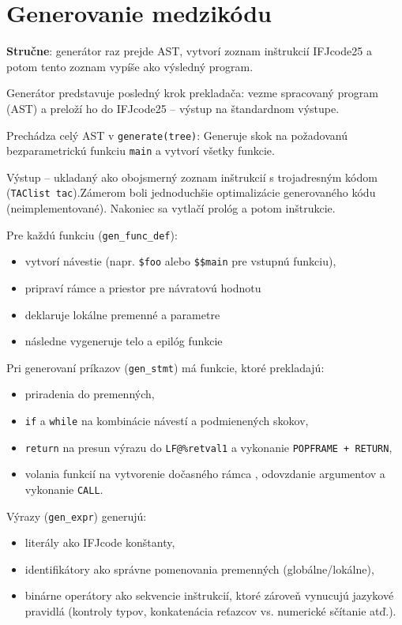 \documentclass{article}
\begin{document}
\section{Generovanie medzikódu}

\textbf{Stručne}: generátor raz prejde AST, vytvorí zoznam inštrukcií IFJcode25 a potom tento
zoznam vypíše ako výsledný program.\bigskip

Generátor predstavuje posledný krok prekladača: vezme spracovaný program (AST) a
preloží ho do IFJcode25 -- výstup na štandardnom výstupe.

Prechádza celý AST v \texttt{generate(tree)}:
Generuje skok na požadovanú bezparametrickú funkciu \texttt{main} a vytvorí všetky funkcie.

Výstup -- ukladaný ako obojsmerný zoznam inštrukcií s trojadresným kódom (\texttt{TAClist tac}).Zámerom boli jednoduchšie optimalizácie generovaného kódu (neimplementované). Nakoniec sa vytlačí prológ a potom inštrukcie.\bigskip

\noindent Pre každú funkciu (\texttt{gen\_func\_def}):

\begin{itemize}
    \item vytvorí návestie (napr. \texttt{\$foo} alebo \texttt{\$\$main} pre vstupnú funkciu),
    \item pripraví rámce a priestor pre návratovú hodnotu
    \item deklaruje lokálne premenné a parametre
    \item následne vygeneruje telo a epilóg funkcie
\end{itemize}

Pri generovaní príkazov (\texttt{gen\_stmt}) má funkcie, ktoré prekladajú:

\begin{itemize}
    \item priradenia do premenných,
    \item \texttt{if} a \texttt{while} na kombinácie návestí a podmienených skokov,
    \item \texttt{return} na presun výrazu do \texttt{LF@\%retval1} a vykonanie \texttt{POPFRAME + RETURN},
    \item volania funkcií na vytvorenie dočasného rámca , odovzdanie argumentov a vykonanie \texttt{CALL}.
\end{itemize}

Výrazy (\texttt{gen\_expr}) generujú:

\begin{itemize}
    \item literály ako IFJcode konštanty,
    \item identifikátory ako správne pomenovania premenných (globálne/lokálne),
    \item binárne operátory ako sekvencie inštrukcií, ktoré zároveň vynucujú jazykové pravidlá (kontroly typov, konkatenácia reťazcov vs. numerické sčítanie atď.).
\end{itemize}
\end{document}
